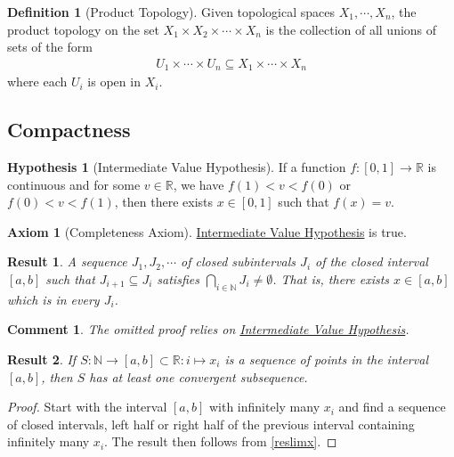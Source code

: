 \documentclass[letterpaper,12pt]{article}
\theoremstyle{plain}
\newtheorem{res}{Result}
\theoremstyle{plain}
\newtheorem*{cmnt*}{Comment}
\theoremstyle{definition}
\newtheorem{defn}{Definition}
\newtheorem{axm}{Axiom}
\newtheorem{hyp}{Hypothesis}
\begin{document}
\begin{defn}[Product Topology]\label{defptop}
Given topological spaces $X_1,\cdots,X_n$, the product topology on the set $X_1\times X_2 \times \cdots \times X_n$ is the collection of all unions of sets of the form
\begin{align*}
U_1 \times \cdots \times U_n \subseteq X_1 \times \cdots \times X_n
\end{align*}
where each $U_i$ is open in $X_i$.
\end{defn}

\subsection{Compactness}
\begin{hyp}[Intermediate Value Hypothesis]\label{hypIVH}
If a function $f:[0,1]\rightarrow \mathbb{R}$ is continuous and for some $v\in \mathbb{R}$, we have $f(1)<v<f(0)$ or $f(0)<v<f(1)$, then there exists $x\in[0,1]$ such that $f(x)=v$.
\end{hyp}

\begin{axm}[Completeness Axiom]
\hyperref[hypIVH]{Intermediate Value Hypothesis} is true.
\end{axm}

\begin{res}\label{reslimx}
A sequence $J_1,J_2,\cdots$ of closed subintervals $J_i$ of the closed interval $[a,b]$ such that $J_{i+1}\subseteq J_i$ satisfies $\bigcap_{i\in \mathbb{N}}J_i\neq\emptyset$. That is, there exists $x\in[a,b]$ which is in every $J_i$.
\end{res}
\begin{cmnt*}
The omitted proof relies on \hyperref[hypIVH]{Intermediate Value Hypothesis}.
\end{cmnt*}

\begin{res}\label{rescsseq}
If $S:\mathbb{N}\rightarrow [a,b]\subset \mathbb{R}: i\mapsto x_i$ is  a sequence of points in the interval $[a,b]$, then $S$ has at least one convergent subsequence.
\end{res}
\begin{proof}
Start with the interval $[a,b]$ with infinitely many $x_i$ and find a sequence of closed intervals, left half or right half of the previous interval containing infinitely many $x_i$. The result then follows from \autoref{reslimx}. 
\end{proof}
\end{document}
